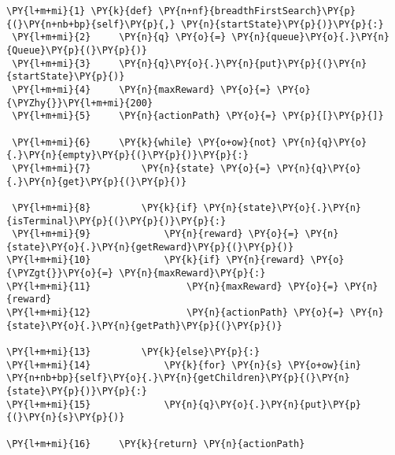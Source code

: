 \begin{Verbatim}[commandchars=\\\{\}]
 \PY{l+m+mi}{1} \PY{k}{def} \PY{n+nf}{breadthFirstSearch}\PY{p}{(}\PY{n+nb+bp}{self}\PY{p}{,} \PY{n}{startState}\PY{p}{)}\PY{p}{:}
 \PY{l+m+mi}{2}     \PY{n}{q} \PY{o}{=} \PY{n}{queue}\PY{o}{.}\PY{n}{Queue}\PY{p}{(}\PY{p}{)}
 \PY{l+m+mi}{3}     \PY{n}{q}\PY{o}{.}\PY{n}{put}\PY{p}{(}\PY{n}{startState}\PY{p}{)}
 \PY{l+m+mi}{4}     \PY{n}{maxReward} \PY{o}{=} \PY{o}{\PYZhy{}}\PY{l+m+mi}{200}
 \PY{l+m+mi}{5}     \PY{n}{actionPath} \PY{o}{=} \PY{p}{[}\PY{p}{]}

 \PY{l+m+mi}{6}     \PY{k}{while} \PY{o+ow}{not} \PY{n}{q}\PY{o}{.}\PY{n}{empty}\PY{p}{(}\PY{p}{)}\PY{p}{:}
 \PY{l+m+mi}{7}         \PY{n}{state} \PY{o}{=} \PY{n}{q}\PY{o}{.}\PY{n}{get}\PY{p}{(}\PY{p}{)}
 
 \PY{l+m+mi}{8}         \PY{k}{if} \PY{n}{state}\PY{o}{.}\PY{n}{isTerminal}\PY{p}{(}\PY{p}{)}\PY{p}{:}
 \PY{l+m+mi}{9}             \PY{n}{reward} \PY{o}{=} \PY{n}{state}\PY{o}{.}\PY{n}{getReward}\PY{p}{(}\PY{p}{)}
\PY{l+m+mi}{10}             \PY{k}{if} \PY{n}{reward} \PY{o}{\PYZgt{}}\PY{o}{=} \PY{n}{maxReward}\PY{p}{:}
\PY{l+m+mi}{11}                 \PY{n}{maxReward} \PY{o}{=} \PY{n}{reward}
\PY{l+m+mi}{12}                 \PY{n}{actionPath} \PY{o}{=} \PY{n}{state}\PY{o}{.}\PY{n}{getPath}\PY{p}{(}\PY{p}{)}

\PY{l+m+mi}{13}         \PY{k}{else}\PY{p}{:}
\PY{l+m+mi}{14}             \PY{k}{for} \PY{n}{s} \PY{o+ow}{in} \PY{n+nb+bp}{self}\PY{o}{.}\PY{n}{getChildren}\PY{p}{(}\PY{n}{state}\PY{p}{)}\PY{p}{:}
\PY{l+m+mi}{15}             \PY{n}{q}\PY{o}{.}\PY{n}{put}\PY{p}{(}\PY{n}{s}\PY{p}{)}

\PY{l+m+mi}{16}     \PY{k}{return} \PY{n}{actionPath}
\end{Verbatim}
